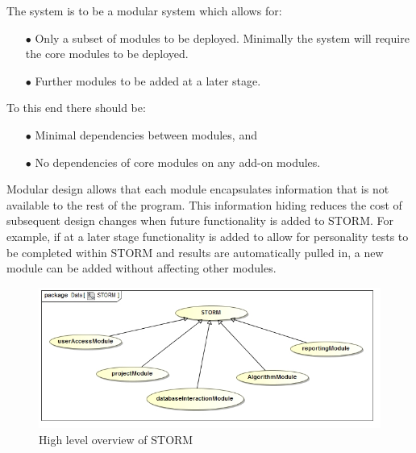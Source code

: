 

\begin{flushleft}
The system is to be a modular system which allows for:
\end{flushleft}

\begin{itemize} 
\item[$\bullet$] Only a subset of modules to be deployed. Minimally the system will require the core modules to be deployed.
\item[$\bullet$] Further modules to be added at a later stage.
\end{itemize}

\begin{flushleft}
To this end there should be:
\end{flushleft}

\begin{itemize} 
\item[$\bullet$] Minimal dependencies between modules, and
\item[$\bullet$] No dependencies of core modules on any add-on modules.
\end{itemize}

\begin{flushleft}
Modular design allows that each module encapsulates information that is not available to the rest of the program. This information hiding reduces the cost of subsequent design changes when future functionality is added to STORM. For example, if at a later stage functionality is added to allow for personality tests to be completed within STORM and results are automatically pulled in, a new module can be added without affecting other modules.
\end{flushleft}

\begin{figure}[h]
\centering
\includegraphics[width=15cm]{./graphics/stormOverview.jpg}
\caption{High level overview of STORM}
\end{figure}